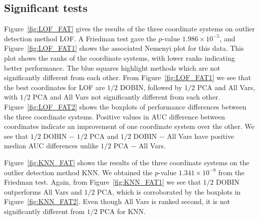 \documentclass[letter,12pt]{article}
\begin{document}
\subsection{Significant tests}\label{sec:DatRepo1}
Figure~\ref{fig:LOF_FAT} gives the results of the three coordinate systems on outlier detection method LOF. A Friedman test gave the $p$-value $1.986 \times 10^{-5}$, and Figure~\ref{fig:LOF_FAT1} shows the associated Nemenyi plot for this data. This plot shows the ranks of the coordinate systems, with lower ranks indicating better performance. The blue squares highlight methods which are not significantly different from each other. From Figure~\ref{fig:LOF_FAT1} we see that the best coordinates for LOF are $1/2$ DOBIN, followed by $1/2$ PCA and All Vars, with $1/2$ PCA and All Vars not significantly different from each other.
Figure~\ref{fig:LOF_FAT2} shows the boxplots of performance differences between the three coordinate systems. Positive values in AUC difference between coordinates  indicate an improvement of one coordinate system over the other. We see that $1/2$ DOBIN $-$ $1/2$ PCA and $1/2$ DOBIN $-$ All Vars have positive median AUC differences unlike $1/2$ PCA $-$ All Vars. %

Figure~\ref{fig:KNN_FAT} shows the results of the three coordinate systems on the outlier detection method KNN. We obtained the $p$-value $1.341\times 10^{-8}$ from the Friedman test. Again, from Figure~\ref{fig:KNN_FAT1} we see that $1/2$ DOBIN outperforms All Vars and $1/2$ PCA, which is corroborated by the boxplots in Figure~\ref{fig:KNN_FAT2}. Even though All Vars is ranked second, it is not significantly different from $1/2$ PCA for KNN.
\end{document}
